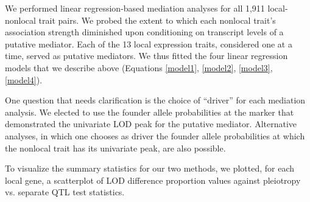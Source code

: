 \documentclass{book}
\begin{document}

We performed linear regression-based mediation analyses for all 1,911 local-nonlocal trait pairs. We probed the extent to which each nonlocal trait's association strength diminished upon conditioning on transcript levels of a putative mediator. Each of the 13 local expression traits, considered one at a time, served as putative mediators. We thus fitted the four linear regression models that we describe above (Equations \ref{model1}, \ref{model2}, \ref{model3}, \ref{model4}).

One question that needs clarification is the choice of ``driver'' for each mediation analysis. We elected to use the founder allele probabilities at the marker that demonstrated the univariate LOD peak for the putative mediator. Alternative analyses, in which one chooses as driver the founder allele probabilities at which the nonlocal trait has its univariate peak, are also possible.




To visualize the summary statistics for our two methods, we plotted, for each local gene, a scatterplot of LOD difference proportion values against pleiotropy vs. separate QTL test statistics.
\end{document}
